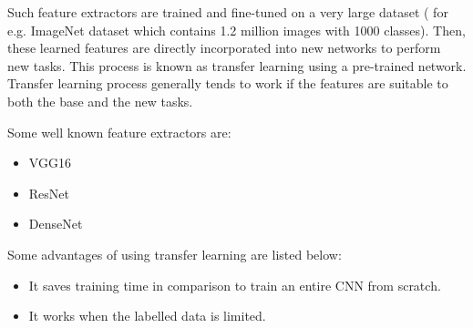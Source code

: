 Such feature extractors are trained and fine-tuned on a very large dataset ( for e.g. ImageNet dataset which contains 1.2 million images with 1000 classes). Then, these learned features are directly incorporated into new networks to perform new tasks. This process is known as transfer learning using a pre-trained network. Transfer learning process generally tends to work if the features are suitable to both the base and the new tasks. 

\par
Some well known feature extractors are: 
\begin{itemize}
    \item VGG16
    \item ResNet
    \item DenseNet
\end{itemize}
\par
Some advantages of using transfer learning are listed below: 

\begin{itemize}
    \item It saves training time in comparison to train an entire CNN from scratch.
    \item It works when the labelled data is limited.
\end{itemize}








